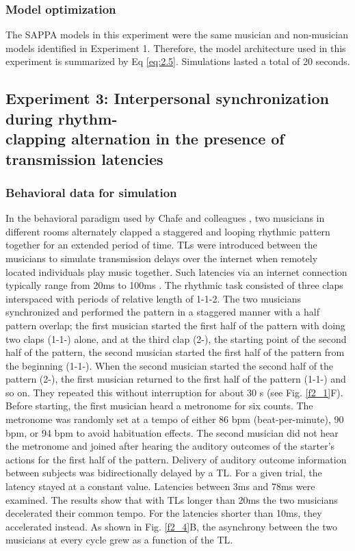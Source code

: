 \documentclass{report}
\begin{document}
\subsubsection{Model optimization}

The SAPPA models in this experiment were the same musician and non-musician models identified in Experiment 1. Therefore, the model architecture used in this experiment is summarized by Eq \eqref{eq:2.5}. Simulations lasted a total of 20 seconds.

\subsection{Experiment 3: Interpersonal synchronization during rhythm-\\ clapping alternation in the presence of transmission latencies}

\subsubsection{Behavioral data for simulation}

In the behavioral paradigm used by Chafe and colleagues \cite{chafe2010effect}, two musicians in different rooms alternately clapped a staggered and looping rhythmic pattern together for an extended period of time. TLs were introduced between the musicians to simulate transmission delays over the internet when remotely located individuals play music together. Such latencies via an internet connection typically range from 20ms to 100ms \cite{caceres2010jacktrip, caceres2008edge}. The rhythmic task consisted of three claps interspaced with periods of relative length of 1-1-2. The two musicians synchronized and performed the pattern in a staggered manner with a half pattern overlap; the first musician started the first half of the pattern with doing two claps (1-1-) alone, and at the third clap (2-), the starting point of the second half of the pattern, the second musician started the first half of the pattern from the beginning (1-1-). When the second musician started the second half of the pattern (2-), the first musician returned to the first half of the pattern (1-1-) and so on. They repeated this without interruption for about 30 s (see Fig.{} \ref{f2_1}F). Before starting, the first musician heard a metronome for six counts. The metronome was randomly set at a tempo of either 86 bpm (beat-per-minute), 90 bpm, or 94 bpm to avoid habituation effects. The second musician did not hear the metronome and joined after hearing the auditory outcomes of the starter's actions for the first half of the pattern. Delivery of auditory outcome information between subjects was bidirectionally delayed by a TL. For a given trial, the latency stayed at a constant value. Latencies between 3ms and 78ms were examined. The results show that with TLs longer than 20ms the two musicians decelerated their common tempo. For the latencies shorter than 10ms, they accelerated instead. As shown in Fig.{} \ref{f2_4}B, the asynchrony between the two musicians at every cycle grew as a function of the TL.
\end{document}
